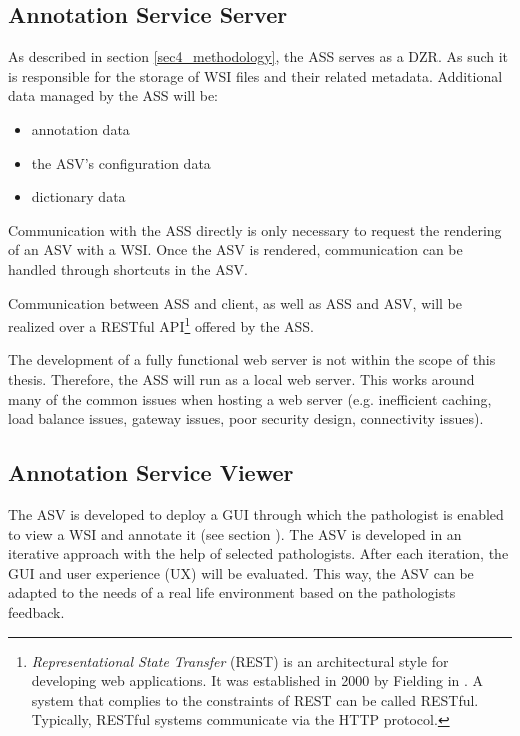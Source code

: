 \subsection{Annotation Service Server}
\label{sec4_assPart}
As described in section \ref{sec4_methodology}, the ASS serves as a DZR. As such it is responsible for the storage of WSI files and their related metadata\cite{Cornish13}. Additional data managed by the ASS will be:

\begin{itemize}
	\item annotation data
	\item the ASV's configuration data
	\item dictionary data
\end{itemize}

Communication with the ASS directly is only necessary to request the rendering of an ASV with a WSI. Once the ASV is rendered, communication can be handled through shortcuts in the ASV.\clearpage

Communication between ASS and client, as well as ASS and ASV, will be realized over a RESTful API\footnote{
	\emph{Representational State Transfer} (REST) is an architectural style for developing web applications. It was established in 2000 by Fielding in \cite{Fielding00}. A system that complies to the constraints of REST can be called RESTful. Typically, RESTful systems communicate via the HTTP protocol\cite{Fielding00}.
	} offered by the ASS.

The development of a fully functional web server is not within the scope of this thesis. Therefore, the ASS will run as a local web server. This works around many of the common issues when hosting a web server (e.g. inefficient caching, load balance issues, gateway issues, poor security design, connectivity issues)\cite{web:typicalissues}.


\subsection{Annotation Service Viewer}
\label{sec4_asvPart}
The ASV is developed to deploy a GUI through which the pathologist is enabled to view a WSI and annotate it (see section ). The ASV is developed in an iterative approach with the help of selected pathologists. After each iteration, the GUI and user experience (UX) will be evaluated. This way, the ASV can be adapted to the needs of a real life environment based on the pathologists feedback.

